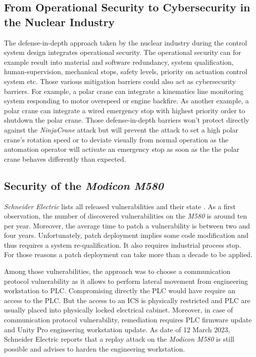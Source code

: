 \subsection{From Operational Security to Cybersecurity in the Nuclear Industry}

The defense-in-depth approach taken by the nuclear industry during the control system design integrates operational security. The operational security can for example result into material and software redundancy, system qualification, human-supervision, mechanical stops, safety levels, priority on actuation control system etc. Those various mitigation barriers could also act as cybersecurity barriers. For example, a polar crane can integrate a kinematics line monitoring system responding to motor overspeed or engine backfire. As another example, a polar crane can integrate a wired emergency stop with highest priority order to shutdown the polar crane. Those defense-in-depth barriers won't protect directly against the \emph{NinjaCrane} attack but will prevent the attack to set a high polar crane's rotation speed or to deviate visually from normal operation as the automation operator will activate an emergency stop as soon as the the polar crane behaves differently than expected. 


\subsection{Security of the \emph{Modicon M580}}

\emph{Schneider Electric} lists all released vulnerabilities and their state \cite{schneider-portal-vuln}. As a first observation, the number of discovered vulnerabilities on the \emph{M580} is around ten per year. Moreover, the average time to patch a vulnerability is between two and four years. Unfortunately, patch deployment implies some code modification and thus requires a system re-qualification. It also requires industrial process stop. For those reasons a patch deployment can take more than a decade to be applied.

Among those vulnerabilities, the approach was to choose a communication protocol vulnerability as it allows to perform lateral movement from engineering workstation to PLC. Compromising directly the PLC would have require an access to the PLC. But the access to an ICS is physically restricted and PLC are usually placed into physically locked electrical cabinet. Moreover, in case of communication protocol vulnerability, remediation requires PLC firmware update and Unity Pro engineering workstation update. As date of 12 March 2023, Schneider Electric reports that a replay attack on the \emph{Modicon M580} is still possible \cite{schneider-replay-attack} and advises to harden the engineering workstation.

